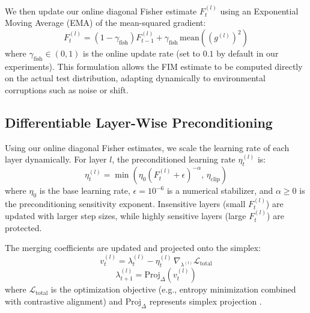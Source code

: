 \documentclass{article}
\theoremstyle{plain}
\theoremstyle{definition}
\begin{document}
We then update our online diagonal Fisher estimate $F_t^{(l)}$ using an Exponential Moving Average (EMA) of the mean-squared gradient:
\begin{equation}
    F_t^{(l)} = (1 - \gamma_{\text{fish}}) F_{t-1}^{(l)} + \gamma_{\text{fish}} \, \text{mean}\left( (g^{(l)})^2 \right)
\end{equation}
where $\gamma_{\text{fish}} \in (0, 1)$ is the online update rate (set to $0.1$ by default in our experiments). This formulation allows the FIM estimate to be computed directly on the actual test distribution, adapting dynamically to environmental corruptions such as noise or shift.

\subsection{Differentiable Layer-Wise Preconditioning}
Using our online diagonal Fisher estimates, we scale the learning rate of each layer dynamically. For layer $l$, the preconditioned learning rate $\eta_t^{(l)}$ is:
\begin{equation}
    \eta_t^{(l)} = \min\left( \eta_0 \left( F_t^{(l)} + \epsilon \right)^{-\alpha}, \, \eta_{\text{clip}} \right)
\end{equation}
where $\eta_0$ is the base learning rate, $\epsilon = 10^{-6}$ is a numerical stabilizer, and $\alpha \geq 0$ is the preconditioning sensitivity exponent. Insensitive layers (small $F_t^{(l)}$) are updated with larger step sizes, while highly sensitive layers (large $F_t^{(l)}$) are protected.

The merging coefficients are updated and projected onto the simplex:
\begin{equation}
    v_t^{(l)} = \lambda_t^{(l)} - \eta_t^{(l)} \, \nabla_{\lambda^{(l)}} \mathcal{L}_{\text{total}}
\end{equation}
\begin{equation}
    \lambda_{t+1}^{(l)} = \text{Proj}_{\Delta} \left( v_t^{(l)} \right)
\end{equation}
where $\mathcal{L}_{\text{total}}$ is the optimization objective (e.g., entropy minimization combined with contrastive alignment) and $\text{Proj}_{\Delta}$ represents simplex projection \cite{adamerging}.
\end{document}
